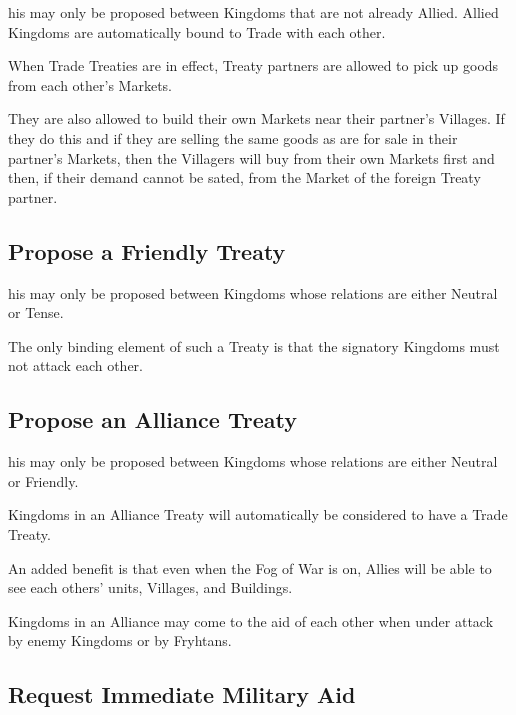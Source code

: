 his may only be proposed between Kingdoms that are not already Allied. Allied Kingdoms are automatically bound to Trade with each other.

When Trade Treaties are in effect, Treaty partners are allowed to pick up goods from each other’s Markets.


They are also allowed to build their own Markets near their partner’s Villages. If they do this and if they are selling the same goods as are for sale in their partner’s Markets, then the Villagers will buy from their own Markets first and then, if their demand cannot be sated, from the Market of the foreign Treaty partner.

\subsection{Propose a Friendly Treaty}


his may only be proposed between Kingdoms whose relations are either Neutral or Tense.

The only binding element of such a Treaty is that the signatory Kingdoms must not attack each other.

\subsection{Propose an Alliance Treaty}


his may only be proposed between Kingdoms whose relations are either Neutral or Friendly.

Kingdoms in an Alliance Treaty will automatically be considered to have a Trade Treaty.

An added benefit is that even when the Fog of War is on, Allies will be able to see each others’ units, Villages, and Buildings.

Kingdoms in an Alliance may come to the aid of each other when under attack by enemy Kingdoms or by Fryhtans.

\subsection{Request Immediate Military Aid}

